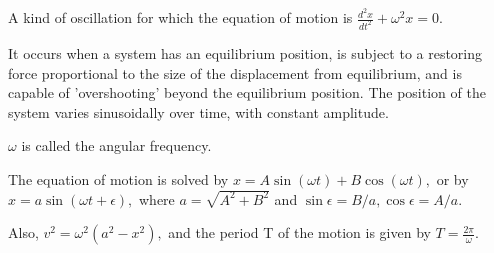  A kind of oscillation for which the equation of motion is
$ \frac{d^2 x}{dt^2} + \omega ^2 x = 0 . $
\par
It occurs when a system has an equilibrium position, is subject
to a restoring force proportional to the size of the displacement
from equilibrium, and is capable of 'overshooting' beyond the equilibrium 
position. The position of the system varies sinusoidally over time,
with constant amplitude.
\par
$ \omega $ is called the angular frequency.
\par
The equation of motion is solved by $ x = A \sin ( \omega t )
+ B \cos ( \omega t ) , $
or by $ x = a \sin ( \omega t + \epsilon ) , $ where 
$ a = \sqrt{A^2 + B^2 } $ and $ \sin \epsilon = B/a , \cos \epsilon = A/a . $
\par
Also, $ v ^2 = \omega ^2 ( a^2 - x^2 ) , $ and the period
T of the motion is given by $ T  = \frac{ 2 \pi }{ \omega} . $
